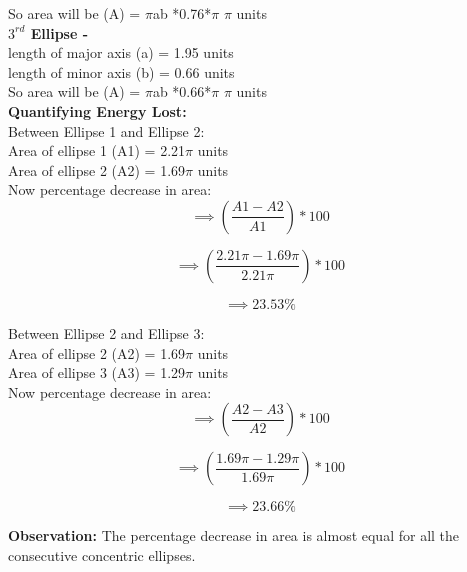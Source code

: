 \documentclass[11pt]{scrartcl} %
\begin{document}
So area will be (A) = $\pi$ab *0.76*$\pi$ $\pi$ units\\

\textbf{$3^{rd}$ Ellipse - }\\
length of major axis (a) = 1.95 units\\
length of minor axis (b) = 0.66 units\\

So area will be (A) = $\pi$ab *0.66*$\pi$ $\pi$ units\\

\textbf{Quantifying Energy Lost:}\\
Between Ellipse 1 and Ellipse 2:\\

Area of ellipse 1 (A1) = 2.21$\pi$ units\\
Area of ellipse 2 (A2) = 1.69$\pi$ units\\

Now percentage decrease in area:
\begin{equation*}
\implies (\frac{A1-A2}{A1})*100
\end{equation*}

\begin{equation*}
\implies (\frac{2.21\pi-1.69\pi}{2.21\pi})*100
\end{equation*}

\begin{equation*}
\implies 23.53 \%
\end{equation*}

Between Ellipse 2 and Ellipse 3:\\

Area of ellipse 2 (A2) = 1.69$\pi$ units\\
Area of ellipse 3 (A3) = 1.29$\pi$ units\\

Now percentage decrease in area:
\begin{equation*}
\implies (\frac{A2-A3}{A2})*100
\end{equation*}

\begin{equation*}
\implies (\frac{1.69\pi-1.29\pi}{1.69\pi})*100
\end{equation*}

\begin{equation*}
\implies 23.66 \%
\end{equation*}

\textbf{Observation:}
The percentage decrease in area is almost equal for all the consecutive concentric ellipses.\\
\end{document}
